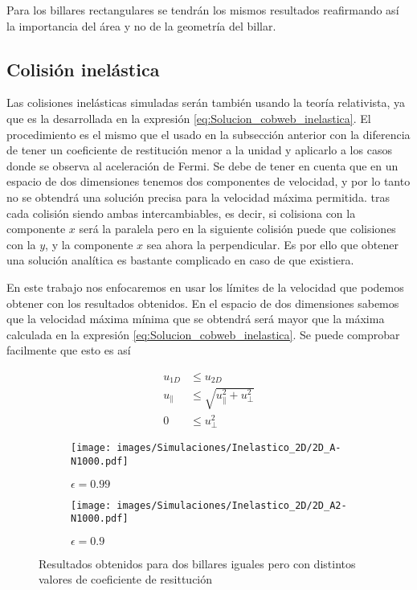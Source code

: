 Para los billares rectangulares se tendrán los mismos resultados reafirmando así la importancia del área y no de la geometría del billar. 


\subsection{Colisión inelástica}

Las colisiones inelásticas simuladas serán también usando la teoría relativista, ya que es la desarrollada en la expresión \ref{eq:Solucion_cobweb_inelastica}. El procedimiento es el mismo que el usado en la subsección anterior con la diferencia de tener un coeficiente de restitución menor a la unidad y aplicarlo a los casos donde se observa al aceleración de Fermi. Se debe de tener en cuenta que en un espacio de dos dimensiones tenemos dos componentes de velocidad, y por lo tanto no se obtendrá una solución precisa para la velocidad máxima permitida.  tras cada colisión siendo ambas intercambiables, es decir, si colisiona con la componente \( x \) será la paralela pero en la siguiente colisión puede que colisiones con la \( y \), y la componente \( x \) sea ahora la perpendicular. Es por ello que obtener una solución analítica es bastante complicado en caso de que existiera. 

\vspace{3mm}

En este trabajo nos enfocaremos en usar los límites de la velocidad que podemos obtener con los resultados obtenidos. En el espacio de dos dimensiones sabemos que la velocidad máxima mínima que se obtendrá será mayor que la máxima calculada en la expresión \ref{eq:Solucion_cobweb_inelastica}. Se puede comprobar facilmente que esto es así

\begin{align}
    u_{1D} &\leq u_{2D} \nonumber\\
    u_{\parallel} &\leq \sqrt{u_\parallel^2 + u_\perp^2}\\
     0 &\leq u_\perp^2 \nonumber
\end{align}

\begin{figure}[!h]
    \begin{subfigure}[b]{0.5\textwidth}
        \centering
        \texttt{[image: images/Simulaciones/Inelastico\_2D/2D\_A-N1000.pdf]}
        \caption{\( \epsilon = 0.99 \)}
    \end{subfigure}
    \hfill
    \begin{subfigure}[b]{0.5\textwidth}
        \centering
        \texttt{[image: images/Simulaciones/Inelastico\_2D/2D\_A2-N1000.pdf]}
        \caption{\( \epsilon = 0.9 \)}
    \end{subfigure}
    \caption{Resultados obtenidos para dos billares iguales pero con distintos valores de coeficiente de resittución}
    \label{fig:2DR_A-N1000_Ine}
\end{figure}

